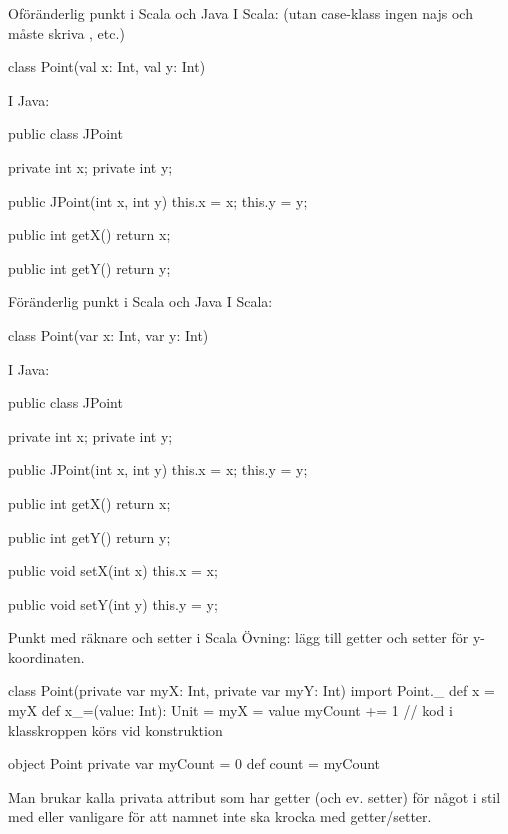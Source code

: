 \begin{Slide}{Oföränderlig punkt  i Scala och Java}\SlideFontSmall
I Scala: (utan case-klass ingen najs  och måste skriva , etc.)
\begin{Code}
class Point(val x: Int, val y: Int)
\end{Code}

\pause
I Java:
\begin{Code}[language=Java,basicstyle=\ttfamily\SlideFontSize{5.8}{7}]
public class JPoint {
    private int x;
    private int y;

    public JPoint(int x, int y){
        this.x = x;
        this.y = y;
    }

    public int getX(){
        return x;
    }

    public int getY(){
        return y;
    }
}
\end{Code}
\end{Slide}

\begin{Slide}{Föränderlig punkt  i Scala och Java}\SlideFontSmall
I Scala:
\begin{Code}
class Point(var x: Int, var y: Int)
\end{Code}
\pause
I Java:
\begin{Code}[language=Java,basicstyle=\ttfamily\SlideFontSize{5.2}{6}]
public class JPoint {
    private int x;
    private int y;

    public JPoint(int x, int y){
        this.x = x;
        this.y = y;
    }

    public int getX(){
        return x;
    }

    public int getY(){
        return y;
    }

    public void setX(int x){
        this.x = x;
    }

    public void setY(int y){
        this.y = y;
    }
}
\end{Code}
\end{Slide}

\begin{Slide}{Punkt med räknare och setter i Scala}
Övning: lägg till getter och setter för y-koordinaten.
\begin{Code}
class Point(private var myX: Int, private var myY: Int){
  import Point._
  def x = myX
  def x_=(value: Int): Unit = {
    myX = value
  }
  myCount += 1   // kod i klasskroppen körs vid konstruktion
}

object Point {
  private var myCount = 0
  def count = myCount
}
\end{Code}
\SlideFontSmall
Man brukar kalla privata attribut som har getter (och ev. setter) för något i stil med  eller vanligare  för att namnet inte ska krocka med getter/setter.
\end{Slide}




